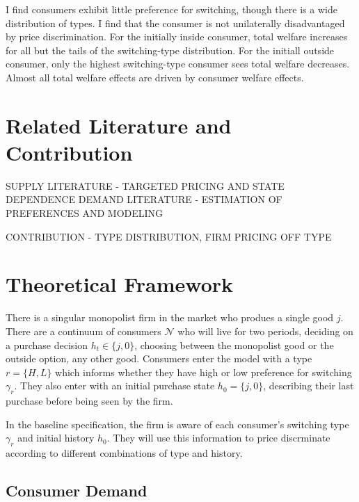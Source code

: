 \documentclass[12pt]{article}
\theoremstyle{definition}
\theoremstyle{remark}
\begin{document}
I find consumers exhibit little preference for switching, though there is a wide distribution of types. I find that the consumer is not unilaterally disadvantaged by price discrimination. For the initially inside consumer, total welfare increases for all but the tails of the switching-type distribution. For the initiall outside consumer, only the highest switching-type consumer sees total welfare decreases. Almost all total welfare effects are driven by consumer welfare effects. 



\section{Related Literature and Contribution}
\label{sec:literature}

SUPPLY LITERATURE - TARGETED PRICING AND STATE DEPENDENCE
DEMAND LITERATURE - ESTIMATION OF PREFERENCES AND MODELING

CONTRIBUTION - TYPE DISTRIBUTION, FIRM PRICING OFF TYPE




\section{Theoretical Framework}
\label{sec:theory}

There is a singular monopolist firm in the market who produes a single good $j$. There are a continuum of consumers $\mathcal{N}$ who will live for two periods, deciding on a purchase decision $h_t \in \{j, 0\}$, choosing between the monopolist good or the outside option, any other good. Consumers enter the model with a type $r = \{H, L\}$ which informs whether they have high or low preference for switching $\gamma_r$. They also enter with an initial purchase state $h_0 = \{j, 0\}$, describing their last purchase before being seen by the firm.

In the baseline specification, the firm is aware of each consumer's switching type $\gamma_r$ and initial history $h_0$. They will use this information to price discrminate according to different combinations of type and history.

\subsection{Consumer Demand}
\label{subsec:model-demand}
\end{document}

